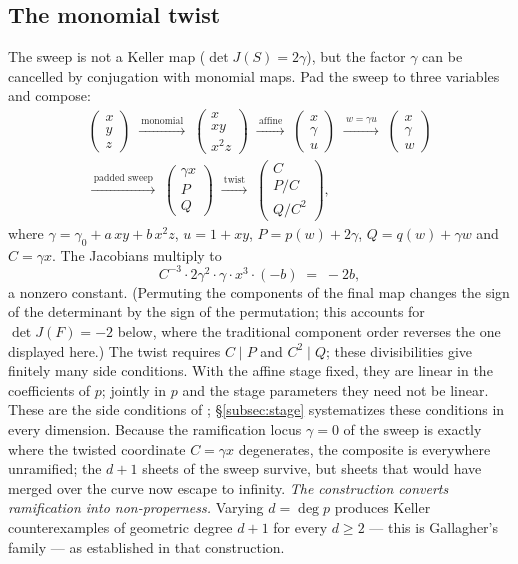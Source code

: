 \documentclass[11pt]{article}
\numberwithin{equation}{section}
\theoremstyle{plain}
\theoremstyle{definition}
\theoremstyle{remark}
\begin{document}
\subsection{The monomial twist}\label{subsec:twist}
The sweep is not a Keller map ($\det J(S)=2\gamma$), but the factor $\gamma$ can be
cancelled by conjugation with monomial maps. Pad the sweep to three variables and
compose:
\begin{multline*}
\begin{pmatrix}x\\ y\\ z\end{pmatrix}
\;\xrightarrow{\ \text{monomial}\ }\;
\begin{pmatrix}x\\ xy\\ x^2z\end{pmatrix}
\;\xrightarrow{\ \text{affine}\ }\;
\begin{pmatrix}x\\ \gamma\\ u\end{pmatrix}
\;\xrightarrow{\ w=\gamma u\ }\;
\begin{pmatrix}x\\ \gamma\\ w\end{pmatrix}\\
\xrightarrow{\ \text{padded sweep}\ }\;
\begin{pmatrix}\gamma x\\ P\\ Q\end{pmatrix}
\;\xrightarrow{\ \text{twist}\ }\;
\begin{pmatrix}C\\ P/C\\ Q/C^2\end{pmatrix},
\end{multline*}
where $\gamma=\gamma_0+a\,xy+b\,x^2z$, $u=1+xy$, $P=p(w)+2\gamma$,
$Q=q(w)+\gamma w$ and $C=\gamma x$. The Jacobians multiply to
\[
C^{-3}\cdot 2\gamma^2\cdot\gamma\cdot x^3\cdot(-b)\;=\;-2b,
\]
a nonzero constant. (Permuting the components of the final map changes the sign
of the determinant by the sign of the permutation; this accounts for
$\det J(F)=-2$ below, where the traditional component order reverses the one
displayed here.) The twist requires $C\mid P$ and $C^2\mid Q$; these
divisibilities give finitely many side conditions. With the affine stage
fixed, they are linear in the coefficients of $p$; jointly in $p$ and
the stage parameters they need not be linear. These are the side conditions of
\cite{Speyer2026}; \S\ref{subsec:stage} systematizes these conditions in every
dimension. Because the
ramification locus $\gamma=0$ of the sweep is exactly where the twisted coordinate
$C=\gamma x$ degenerates, the composite is everywhere unramified; the
$d+1$ sheets of the sweep survive, but sheets that would have merged over the
curve now escape to infinity. \emph{The construction converts ramification into
non-properness.} Varying $d=\deg p$ produces Keller counterexamples of geometric
degree $d+1$ for every $d\ge2$ --- this is Gallagher's family
\cite{Gallagher2026} --- as established in that construction.
\end{document}
